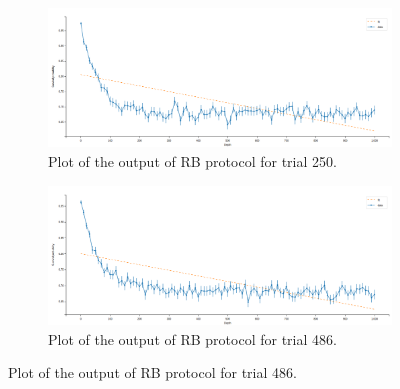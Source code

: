 \begin{figure}[h!]
    \centering
    \begin{subfigure}[t]{0.495\textwidth}
        \includegraphics[width=\textwidth]{figures/png/RB_optimization/Optuna/1000beta/failed1.png}
        \caption{Plot of the output of RB protocol for trial 250.}
        \label{fig:optuna1000beta:failed1}
    \end{subfigure}
    \hfill
    \begin{subfigure}[t]{0.495\textwidth}
        \includegraphics[width=\textwidth]{figures/png/RB_optimization/Optuna/1000beta/failed2.png}
        \caption{Plot of the output of RB protocol for trial 486.}
        \label{fig:optuna1000beta:failed2}
    \end{subfigure}

    \vspace{0.5cm}


\end{figure}
